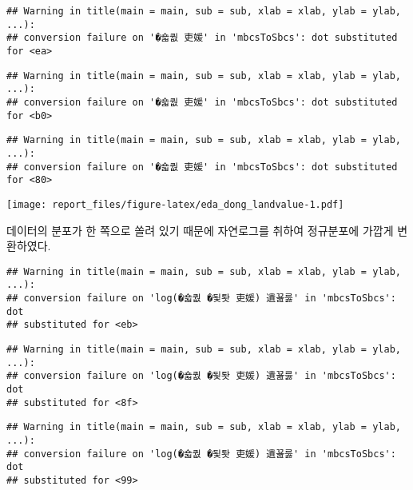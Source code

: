 \documentclass[]{article}
\newenvironment{Shaded}{\begin{snugshade}}{\end{snugshade}}
\newcommand{\DataTypeTok}[1]{\textcolor[rgb]{0.13,0.29,0.53}{#1}}
\newcommand{\KeywordTok}[1]{\textcolor[rgb]{0.13,0.29,0.53}{\textbf{#1}}}
\newcommand{\NormalTok}[1]{#1}
\newcommand{\OperatorTok}[1]{\textcolor[rgb]{0.81,0.36,0.00}{\textbf{#1}}}
\newcommand{\StringTok}[1]{\textcolor[rgb]{0.31,0.60,0.02}{#1}}
\begin{document}
\begin{verbatim}
## Warning in title(main = main, sub = sub, xlab = xlab, ylab = ylab, ...):
## conversion failure on '�숇퀎 吏媛' in 'mbcsToSbcs': dot substituted for <ea>
\end{verbatim}

\begin{verbatim}
## Warning in title(main = main, sub = sub, xlab = xlab, ylab = ylab, ...):
## conversion failure on '�숇퀎 吏媛' in 'mbcsToSbcs': dot substituted for <b0>
\end{verbatim}

\begin{verbatim}
## Warning in title(main = main, sub = sub, xlab = xlab, ylab = ylab, ...):
## conversion failure on '�숇퀎 吏媛' in 'mbcsToSbcs': dot substituted for <80>
\end{verbatim}

\texttt{[image: report\_files/figure-latex/eda\_dong\_landvalue-1.pdf]}

데이터의 분포가 한 쪽으로 쏠려 있기 때문에 자연로그를 취하여 정규분포에
가깝게 변환하였다.

\begin{Shaded}
\end{Shaded}

\begin{verbatim}
## Warning in title(main = main, sub = sub, xlab = xlab, ylab = ylab, ...):
## conversion failure on 'log(�숇퀎 �됯퇏 吏媛) 遺꾪룷' in 'mbcsToSbcs': dot
## substituted for <eb>
\end{verbatim}

\begin{verbatim}
## Warning in title(main = main, sub = sub, xlab = xlab, ylab = ylab, ...):
## conversion failure on 'log(�숇퀎 �됯퇏 吏媛) 遺꾪룷' in 'mbcsToSbcs': dot
## substituted for <8f>
\end{verbatim}

\begin{verbatim}
## Warning in title(main = main, sub = sub, xlab = xlab, ylab = ylab, ...):
## conversion failure on 'log(�숇퀎 �됯퇏 吏媛) 遺꾪룷' in 'mbcsToSbcs': dot
## substituted for <99>
\end{verbatim}
\end{document}
